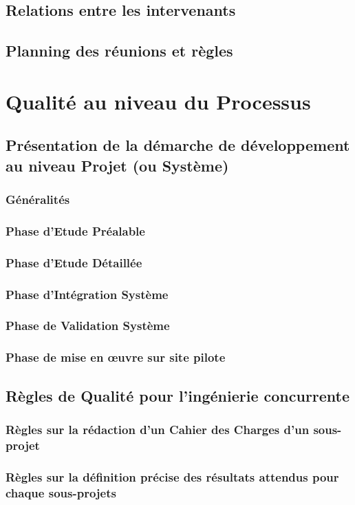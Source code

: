 \subsection{Relations entre les intervenants}
\subsection{Planning des réunions et règles}

\section{Qualité au niveau du Processus}
\subsection{Présentation de la démarche de développement au niveau Projet (ou Système)}
\subsubsection{Généralités              }
\subsubsection{Phase d’Etude Préalable }
\subsubsection{Phase d’Etude Détaillée}
\subsubsection{Phase d’Intégration Système }
\subsubsection{Phase de Validation Système}
\subsubsection{Phase de mise en œuvre sur site pilote}
\subsection{Règles de Qualité pour l’ingénierie concurrente}
\subsubsection{Règles sur la rédaction d’un Cahier des Charges d’un sous-projet}
\subsubsection{Règles sur la définition précise des résultats attendus pour chaque sous-projets}
